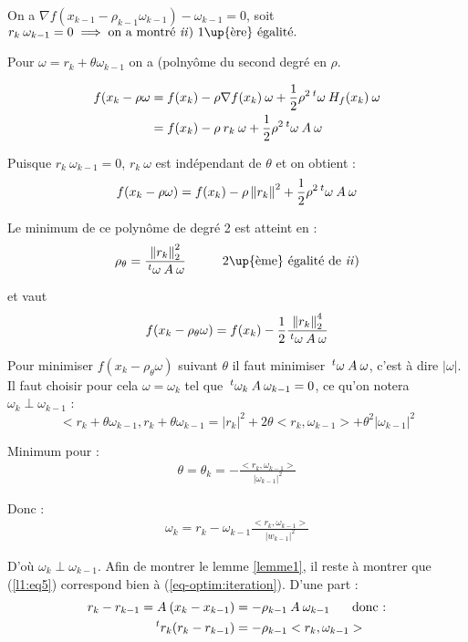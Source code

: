 On a $\nabla f(x_{k-1} - \rho_{k-1} \omega_{k-1}) - \omega_{k-1} = 0$, soit
$r_k \: \omega_{k-1} = 0 \implies \text{on a montré \textit{ii}) 1\up{ère} égalité.}$

Pour $\omega = r_k + \theta \omega_{k-1}$ on a (polnyôme du second degré en $\rho$.

\begin{align*}
    f(x_k - \rho \omega & = f(x_k) - \rho \nabla f(x_k) \: \omega + \frac{1}{2} \rho^2 \,^t\omega \: H_f(x_k) \: \omega \\
    & = f(x_k) - \rho \: r_k \: \omega + \frac{1}{2} \rho^2 \,^t\omega \: A \: \omega
\end{align*}

Puisque $r_k \: \omega_{k-1} = 0$, $r_k \: \omega$ est indépendant de $\theta$ et on obtient :
\begin{align}
    f(x_k - \rho \omega) = f(x_k) - \rho \left\lVert r_k\right\rVert^2 + \frac{1}{2} \rho^2 \,^t\omega \: A \: \omega
    \label{eq-optim:4}
\end{align}

Le minimum de ce polynôme de degré 2 est atteint en :
\[
    \rho_{\theta} = \frac{\norm{r_k}^2_2}{\tpo \omega \: A \: \omega} \hspace{1cm}
    \text{2\up{ème} égalité de \textit{ii})}
\]

et vaut 
\[
    f(x_k - \rho_\theta \omega) = f(x_k) - \frac{1}{2} \frac{\left\lVert r_k\right\rVert_2^4}{\,^t\omega \: A \: \omega}
\]

Pour minimiser $f(x_k - \rho_\theta \omega)$ suivant $\theta$ il faut minimiser 
$\,^t\omega \: A \: \omega$, c'est à dire $|\omega|$.
Il faut choisir pour cela $\omega = \omega_k$ tel que $\,^t\omega_k \: A \: \omega_{k-1} = 0$, ce qu'on notera $\omega_k \perp \omega_{k-1}$ :
\[
    < r_k + \theta \omega_{k-1}, r_k + \theta \omega_{k-1} = |r_k|^2 + 2 \theta <r_k, \omega_{k-1} >
    + \theta^2 |\omega_{k-1}|^2
\]

Minimum pour :
\begin{align}
    \theta = \theta_k = - \frac{<r_k, \omega_{k-1}>}{|\omega_{k-1}|^2}
    \label{l1:eq5}
\end{align}

Donc :
\begin{align}
    \omega_k = r_k - \omega_{k-1} \frac{<r_k,\omega_{k-1}>}{|w_{k-1}|^2}
    \label{l1:eq6}
\end{align}

D'où $\omega_k \perp \omega_{k-1}$. Afin de montrer le lemme \ref{lemme1}, il reste à
montrer que (\ref{l1:eq5}) correspond bien à (\ref{eq-optim:iteration}).
D'une part :
\begin{align}
    r_k - r_{k-1} = A \: (x_k - x_{k-1}) & = - \rho_{k-1} \: A \: \omega_{k-1} \hspace{0.5cm}\text{ donc :} \notag \\
    \,^tr_k (r_k - r_{k-1}) & = - \rho_{k-1} <r_k,\omega_{k-1}>
    \label{l1:eq7}
\end{align}

